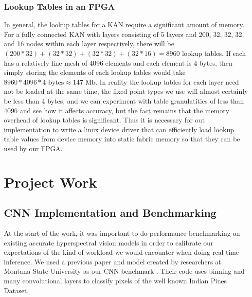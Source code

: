 \documentclass{article}
\begin{document}
\subsubsection{Lookup Tables in an FPGA}
In general, the lookup tables for a KAN require a significant amount of memory. For a fully connected KAN with layers consisting of 5 layers and 200, 32, 32, 32, and 16 nodes within each layer respectively, there will be $(200 * 32) + (32 * 32) + (32 * 32) + (32 * 16) = 8960$ lookup tables. If each has a relatively fine mesh of 4096 elements and each element is 4 bytes, then simply storing the elements of each lookup tables would take $8960 * 4096 * 4 \text{ bytes} \approx 147 \text{ Mb}$. In reality the lookup tables for each layer need not be loaded at the same time, the fixed point types we use will almost certainly be less than $4$ bytes, and we can experiment with table granulatities of less than $4096$ and see how it affects accuracy, but the fact remains that the memory overhead of lookup tables is significant. Thus it is necessary for out implementation to write a linux device driver that can efficiently load lookup table values from device memory into static fabric memory so that they can be used by our FPGA.


\section{Project Work}

\subsection{CNN Implementation and Benchmarking}
At the start of the work, it was important to do performance benchmarking on existing accurate hyperspectral vision models in order to calibrate our expectations of the kind of workload we would encounter when doing real-time inference. We used a previous paper and model created by researchers at Montana State University as our CNN benchmark \cite{Morales_2021} \cite{rs13183649}. Their code uses binning and many convolutional layers to classify pixels of the well known Indian Pines Dataset.
\end{document}
